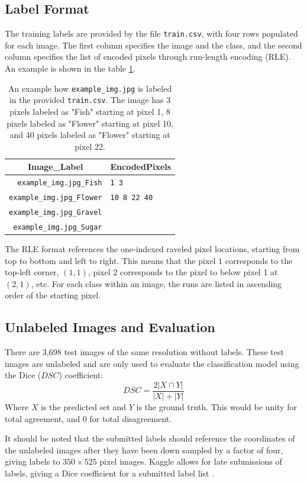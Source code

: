 \subsection{Label Format}
The training labels are provided by the file \texttt{train.csv}, with four rows populated for each image. The first column specifies the image and the class, and the second column specifies the list of encoded pixels through run-length encoding (RLE). An example is shown in the table \cref{tab:RLE_ex}.
%
\begin{table}[h!]
    \centering
    \begin{tabular}{r|l}
    \multicolumn{1}{c|}{Image\_Label} & \multicolumn{1}{c}{EncodedPixels} \\ \hline
    \texttt{example\_img.jpg\_Fish}   & \texttt{1 3}        \\ \hline
    \texttt{example\_img.jpg\_Flower} & \texttt{10 8 22 40} \\ \hline
    \texttt{example\_img.jpg\_Gravel} &                                      \\ \hline
    \texttt{example\_img.jpg\_Sugar}  &                                     
    \end{tabular}
    \caption{An example how \texttt{example\_img.jpg} is labeled in the provided \texttt{train.csv}. The image has 3 pixels labeled as "Fish" starting at pixel 1, 8 pixels labeled as "Flower" starting at pixel 10, and 40 pixels labeled as "Flower" starting at pixel 22.}
    \label{tab:RLE_ex}
\end{table}

The RLE format references the one-indexed raveled pixel locations, starting from top to bottom and left to right. This means that the pixel \(1\) corresponds to the top-left corner, \((1,1)\), pixel \(2\) corresponds to the pixel to below pixel 1 at \((2, 1)\), etc. For each class within an image, the runs are listed in ascending order of the starting pixel. 
% 
\subsection{Unlabeled Images and Evaluation} \label{eval}
There are 3,698 test images of the same resolution without labels. These test images are unlabeled and are only used to evaluate the classification model using the Dice (\(DSC\)) coefficient: 
%
\begin{equation*}
    DSC = \frac{2 | X \cap Y |}{|X| + |Y|}
\end{equation*}
%
Where \(X\) is the predicted set and \(Y\) is the ground truth. This would be unity for total agreement, and 0 for total disagreement. 

It should be noted that the submitted labels should reference the coordinates of the unlabeled images after they have been down sampled by a factor of four, giving labels to \(350 \times 525\) pixel images. Kaggle allows for late submissions of labels, giving a Dice coefficient for a submitted label list \cite{maxplanckinstituteformeteorology_UnderstandingCloudsSatellite_}. 